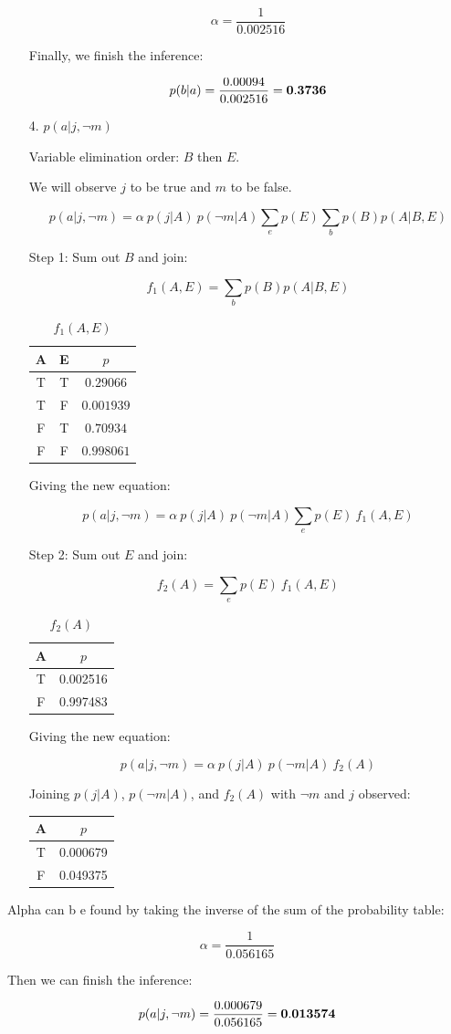\documentclass[fleqn]{hw}
\begin{document}
\begin{enumerate}
$$\alpha = \frac{1}{0.002516}$$

Finally, we finish the inference:

$$p(b|a) = \frac{0.00094}{0.002516} = {\bf 0.3736}$$
\newpage

\item[4.] $p(a|j, \lnot m)$	

Variable elimination order: $B$ then $E$.

We will observe $j$ to be true and $m$ to be false.

$$p(a | j, \lnot m) = \alpha \ p(j | A) \ p(\lnot m | A) \sum_{e} p(E) \sum_{b} p(B) p(A | B, E)$$

Step 1: Sum out $B$ and join:

$$f_1(A, E) = \sum_{b} p(B) p(A | B, E)$$

\begin{table}[H]
\centering	
\begin{tabular}{|cc|c|}
\hline
{\bf A} & {\bf E} & $p$ \\
\hline
T & T & $0.29066$ \\
T & F & $0.001939$ \\
F & T & $0.70934$ \\
F & F & $0.998061$ \\
\hline
\end{tabular}
\caption{$f_1(A, E)$}
\end{table}

Giving the new equation:

$$p(a | j, \lnot m) = \alpha \ p(j | A) \ p(\lnot m | A) \sum_{e} p(E) \ f_1(A, E)$$

Step 2: Sum out $E$ and join:

$$f_2(A) = \sum_{e} p(E) \ f_1(A, E)$$

\begin{table}[H]
\centering	
\begin{tabular}{|c|c|}
\hline
{\bf A} & $p$ \\
\hline
T & 0.002516 \\
F & 0.997483 \\
\hline
\end{tabular}
\caption{$f_2(A)$}
\end{table}

Giving the new equation:

$$p(a | j, \lnot m) = \alpha \ p(j | A) \ p(\lnot m | A) \ f_2(A)$$

Joining $p(j | A)$, $p(\lnot m | A)$, and $f_2(A)$ with $\lnot m$ and $j$ observed:

\begin{table}[H]
\centering	
\begin{tabular}{|c|c|}
\hline
{\bf A} & $p$ \\
\hline
T & 0.000679 \\
F & 0.049375 \\
\hline
\end{tabular}
\end{table}
\end{enumerate}

Alpha can b e found by taking the inverse of the sum of the probability table:

$$\alpha = \frac{1}{0.056165}$$

Then we can finish the inference:

$$p(a | j, \lnot m) = \frac{0.000679}{0.056165} = {\bf 0.013574}$$
\end{document}
